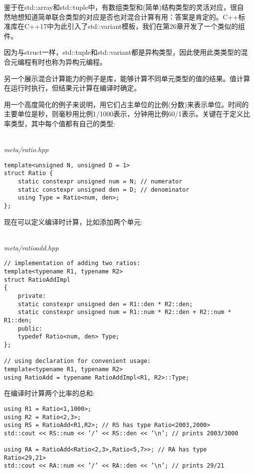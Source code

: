 鉴于在std::array和std::tuple中，有数组类型和(简单)结构类型的灵活对应，很自然地想知道简单联合类型的对应是否也对混合计算有用：答案是肯定的。C++标准库在C++17中为此引入了std::variant模板，我们在第26章开发了一个类似的组件。

因为与struct一样，std::tuple和std::variant都是异构类型，因此使用此类类型的混合元编程有时也称为异构元编程。


另一个展示混合计算能力的例子是库，能够计算不同单元类型的值的结果。值计算在运行时执行，但结果元计算在编译时确定。

用一个高度简化的例子来说明，用它们占主单位的比例(分数)来表示单位。时间的主要单位是秒，则毫秒用比例1/1000表示，分钟用比例60/1表示。关键在于定义比率类型，其中每个值都有自己的类型:

\hspace*{\fill} \\ %
\noindent
\textit{meta/ratio.hpp}
\begin{lstlisting}[style=styleCXX]
template<unsigned N, unsigned D = 1>
struct Ratio {
	static constexpr unsigned num = N; // numerator
	static constexpr unsigned den = D; // denominator
	using Type = Ratio<num, den>;
};
\end{lstlisting}

现在可以定义编译时计算，比如添加两个单元:

\hspace*{\fill} \\ %
\noindent
\textit{meta/ratioadd.hpp}
\begin{lstlisting}[style=styleCXX]
// implementation of adding two ratios:
template<typename R1, typename R2>
struct RatioAddImpl
{
	private:
	static constexpr unsigned den = R1::den * R2::den;
	static constexpr unsigned num = R1::num * R2::den + R2::num * R1::den;
	public:
	typedef Ratio<num, den> Type;
};

// using declaration for convenient usage:
template<typename R1, typename R2>
using RatioAdd = typename RatioAddImpl<R1, R2>::Type;
\end{lstlisting}

在编译时计算两个比率的总和:

\begin{lstlisting}[style=styleCXX]
using R1 = Ratio<1,1000>;
using R2 = Ratio<2,3>;
using RS = RatioAdd<R1,R2>; // RS has type Ratio<2003,2000>
std::cout << RS::num << ’/’ << RS::den << ’\n’; // prints 2003/3000

using RA = RatioAdd<Ratio<2,3>,Ratio<5,7>>; // RA has type Ratio<29,21>
std::cout << RA::num << ’/’ << RA::den << ’\n’; // prints 29/21
\end{lstlisting}

